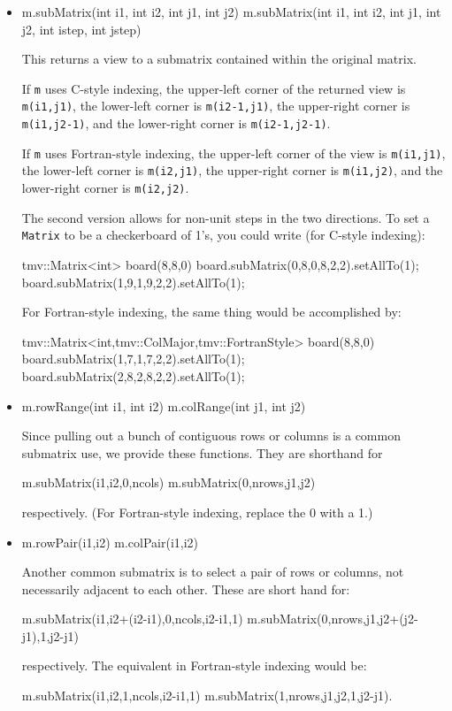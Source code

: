 \documentclass[twoside,letterpaper,11pt]{article}
\renewcommand{\tt}[1]{{\lstinline {#1}}}
\begin{document}
\begin{itemize}
\item
\begin{tmvcode}
m.subMatrix(int i1, int i2, int j1, int j2)
m.subMatrix(int i1, int i2, int j1, int j2, int istep, int jstep)
\end{tmvcode}
This returns a view to a submatrix contained within the original matrix.

If \tt{m} uses C-style indexing, 
the upper-left corner of the returned view is \tt{m(i1,j1)},
the lower-left corner is \tt{m(i2-1,j1)},
the upper-right corner is \tt{m(i1,j2-1)}, and
the lower-right corner is \tt{m(i2-1,j2-1)}.

If \tt{m} uses Fortran-style indexing, 
the upper-left corner of the view is \tt{m(i1,j1)},
the lower-left corner is \tt{m(i2,j1)},
the upper-right corner is \tt{m(i1,j2)}, and
the lower-right corner is \tt{m(i2,j2)}.

The second version allows for non-unit steps in the two directions.
To set a \tt{Matrix} to be a checkerboard of 1's, you could write 
(for C-style indexing):
\begin{tmvcode}
tmv::Matrix<int> board(8,8,0)
board.subMatrix(0,8,0,8,2,2).setAllTo(1);
board.subMatrix(1,9,1,9,2,2).setAllTo(1);
\end{tmvcode}

For Fortran-style indexing, the same thing would be accomplished by:
\begin{tmvcode}
tmv::Matrix<int,tmv::ColMajor,tmv::FortranStyle> board(8,8,0)
board.subMatrix(1,7,1,7,2,2).setAllTo(1);
board.subMatrix(2,8,2,8,2,2).setAllTo(1);
\end{tmvcode}

\item
\begin{tmvcode}
m.rowRange(int i1, int i2)
m.colRange(int j1, int j2)
\end{tmvcode}
Since pulling out a bunch of contiguous rows or columns is a common 
submatrix use, we provide these functions.  They are shorthand for
\begin{tmvcode}
m.subMatrix(i1,i2,0,ncols)
m.subMatrix(0,nrows,j1,j2)
\end{tmvcode}
respectively.  (For Fortran-style indexing, replace the 0 with a 1.)

\item
\begin{tmvcode}
m.rowPair(i1,i2)
m.colPair(i1,i2)
\end{tmvcode}
Another common submatrix is to select a pair of rows or columns, not 
necessarily adjacent to each other.  These are short hand for:
\begin{tmvcode}
m.subMatrix(i1,i2+(i2-i1),0,ncols,i2-i1,1)
m.subMatrix(0,nrows,j1,j2+(j2-j1),1,j2-j1)
\end{tmvcode}
respectively.  The equivalent in Fortran-style indexing would be:
\begin{tmvcode}
m.subMatrix(i1,i2,1,ncols,i2-i1,1)
m.subMatrix(1,nrows,j1,j2,1,j2-j1).
\end{tmvcode}


\end{itemize}
\end{document}
